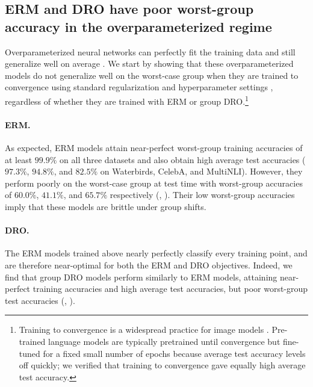 \subsection{ERM and DRO have poor worst-group accuracy in the overparameterized regime}\label{sec:experiments_unreg}

Overparameterized neural networks can perfectly fit the training data and still generalize well on average \citep{zhang2017understanding}.
We start by showing that these overparameterized models do not generalize well on the worst-case group when they are trained to convergence using standard regularization and hyperparameter settings \citep{he2016resnet, devlin2019bert}, regardless of whether they are trained with ERM or group DRO.\footnote{
  Training to convergence is a widespread practice for image models \citep{zhang2017understanding, hoffer2017train}. Pre-trained language models are typically pretrained until convergence \citep{devlin2019bert, radford2019language} but fine-tuned for a fixed small number of epochs because average test accuracy levels off quickly; we verified that training to convergence gave equally high average test accuracy.}

\paragraph{ERM.}
As expected,
ERM models attain near-perfect worst-group training accuracies of at least $99.9\%$ on all three datasets
and also obtain high average test accuracies ($97.3\%$, $94.8\%$, and $82.5\%$ on Waterbirds, CelebA, and MultiNLI).
However, they perform poorly on the worst-case group at test time
with worst-group accuracies of $60.0\%$, $41.1\%$, and $65.7\%$ respectively (, ).
Their low worst-group accuracies imply that these models are
brittle under group shifts.

\paragraph{DRO.}
The ERM models trained above nearly perfectly classify every training point, and are therefore near-optimal for both the ERM  and DRO  objectives.
Indeed, we find that group DRO models perform similarly to ERM models,
attaining near-perfect training accuracies and high average test accuracies, but poor worst-group test accuracies (, ).

